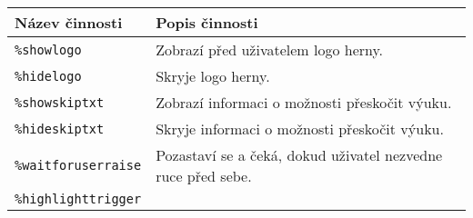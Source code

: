 \begin{longtable}[]{@{}ll@{}}
\toprule
\begin{minipage}[b]{0.05\columnwidth}\raggedright\strut
Název činnosti\strut
\end{minipage} & \begin{minipage}[b]{0.05\columnwidth}\raggedright\strut
Popis činnosti\strut
\end{minipage}\tabularnewline
\midrule
\endhead
\begin{minipage}[t]{0.05\columnwidth}\raggedright\strut
\texttt{\%showlogo}\strut
\end{minipage} & \begin{minipage}[t]{0.05\columnwidth}\raggedright\strut
Zobrazí před uživatelem logo herny.\strut
\end{minipage}\tabularnewline
\begin{minipage}[t]{0.05\columnwidth}\raggedright\strut
\texttt{\%hidelogo}\strut
\end{minipage} & \begin{minipage}[t]{0.05\columnwidth}\raggedright\strut
Skryje logo herny.\strut
\end{minipage}\tabularnewline
\begin{minipage}[t]{0.05\columnwidth}\raggedright\strut
\texttt{\%showskiptxt}\strut
\end{minipage} & \begin{minipage}[t]{0.05\columnwidth}\raggedright\strut
Zobrazí informaci o možnosti přeskočit výuku.\strut
\end{minipage}\tabularnewline
\begin{minipage}[t]{0.05\columnwidth}\raggedright\strut
\texttt{\%hideskiptxt}\strut
\end{minipage} & \begin{minipage}[t]{0.05\columnwidth}\raggedright\strut
Skryje informaci o možnosti přeskočit výuku.\strut
\end{minipage}\tabularnewline
\begin{minipage}[t]{0.05\columnwidth}\raggedright\strut
\texttt{\%waitforuserraise}\strut
\end{minipage} & \begin{minipage}[t]{0.05\columnwidth}\raggedright\strut
Pozastaví se a čeká, dokud uživatel nezvedne ruce před sebe.\strut
\end{minipage}\tabularnewline
\begin{minipage}[t]{0.05\columnwidth}\raggedright\strut
\texttt{\%highlighttrigger}\strut
\end{minipage} & \begin{minipage}[t]{0.05\columnwidth}\raggedright\strut

\end{minipage}
\end{longtable}
